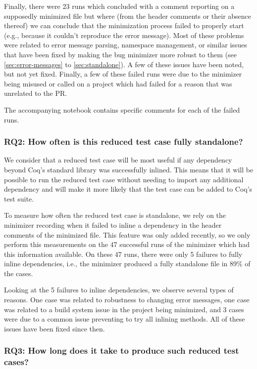 \documentclass[a4paper,USenglish,cleveref,autoref,thm-restate]{lipics-v2021}
\begin{document}
Finally, there were 23 runs which concluded with a comment reporting on a supposedly minimized file but where (from the header comments or their absence thereof) we can conclude that the minimization process failed to properly start (e.g., because it couldn't reproduce the error message). Most of these problems were related to error message parsing, namespace management, or similar issues that have been fixed by making the bug minimizer more robust to them (see \autoref{sec:error-messages} to \autoref{sec:standalone}). A few of these issues have been noted, but not yet fixed. Finally, a few of these failed runs were due to the minimizer being misused or called on a project which had failed for a reason that was unrelated to the PR.

The accompanying notebook contains specific comments for each of the failed runs.

\subsubsection{RQ2: How often is this reduced test case fully standalone?}

We consider that a reduced test case will be most useful if any dependency beyond Coq's standard library was successfully inlined. This means that it will be possible to run the reduced test case without needing to import any additional dependency and will make it more likely that the test case can be added to Coq's test suite.

To measure how often the reduced test case is standalone, we rely on the minimizer recording when it failed to inline a dependency in the header comments of the minimized file. This feature was only added recently, so we only perform this measurements on the 47 successful runs of the minimizer which had this information available.
On these 47 runs, there were only 5 failures to fully inline dependencies, i.e., the minimizer produced a fully standalone file in 89\% of the cases.

Looking at the 5 failures to inline dependencies, we observe several types of reasons. One case was related to robustness to changing error messages, one case was related to a build system issue in the project being minimized, and 3 cases were due to a common issue preventing to try all inlining methods. All of these issues have been fixed since then.

\subsubsection{RQ3: How long does it take to produce such reduced test cases?}
\end{document}
